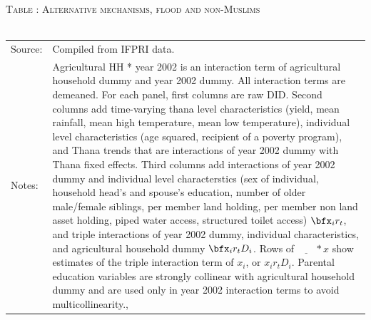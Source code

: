 \begin{table}\hfil\textsc{\footnotesize Table \thetable: Alternative mechanisms, flood and non-Muslims\label{zEm.1999.10.sameN}}\\\setlength{\tabcolsep}{.5pt}\renewcommand{\arraystretch}{.675}\hspace{-2em}\hfil\\\renewcommand{\arraystretch}{1}\hfil\begin{tabular}{>{\hfill\scriptsize}p{1cm}<{}>{\scriptsize}p{12cm}<{\hfill}} Source:& Compiled from IFPRI data. \\[-1ex] Notes:&   \textsf{Agricultural HH * year 2002} is an interaction term of agricultural household dummy and year 2002 dummy. All interaction terms are demeaned. For each panel, first columns are raw DID. Second columns add time-varying thana level characteristics (yield, mean rainfall, mean high temperature, mean low temperature), individual level characteristics (age squared, recipient of a poverty program), and \textsf{Thana trends} that are interactions of year 2002 dummy with Thana fixed effects. Third columns add interactions of year 2002 dummy and individual level characterstics (sex of individual, household head's and spouse's education, number of older male/female siblings, per member land holding, per member non land asset holding, piped water access, structured toilet access) $\bfx_{i}r_{t}$, and triple interactions of year 2002 dummy, individual characteristics, and agricultural household dummy $\bfx_{i}r_{t}D_{i}$. Rows of $\underline{\phantom{mm}}*x$ show estimates of the triple interaction term of $x_{i}$, or $x_{i}r_{t}D_{i}$. Parental education variables are strongly collinear with agricultural household dummy and are used only in year 2002 interaction terms to avoid multicollinearity., \\   \end{tabular} \end{table}

